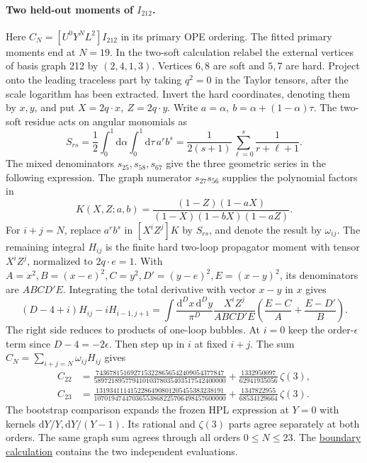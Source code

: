 \paragraph{Two held-out moments of \(I_{212}\).}
Here \(C_N=[U^0Y^NL^2]I_{212}\) in its primary OPE ordering.
The fitted primary moments end at \(N=19\). In the two-soft calculation
relabel the external vertices of basis graph 212 by \((2,4,1,3)\).
Vertices \(6,8\) are soft and \(5,7\) are hard. Project onto the leading
traceless part by taking \(q^2=0\) in the Taylor tensors, after the scale
logarithm has been extracted. Invert the hard coordinates, denoting them
by \(x,y\), and put \(X=2q\cdot x,\ Z=2q\cdot y\).
Write \(a=\alpha,\ b=\alpha+(1-\alpha)\tau\). The two-soft residue acts on
angular monomials as
\[
 S_{rs}=\frac12\int_0^1\!\mathrm d\alpha\int_0^1\!\mathrm d\tau\,a^r b^s
       =\frac1{2(s+1)}\sum_{\ell=0}^{s}\frac1{r+\ell+1}.
\]
The mixed denominators \(s_{25},s_{58},s_{67}\) give the three geometric
series in the following expression. The graph numerator \(s_{27}s_{56}\)
supplies the polynomial factors in
\[
 K(X,Z;a,b)=\frac{(1-Z)(1-aX)}{(1-X)(1-bX)(1-aZ)} .
\]
For \(i+j=N\), replace \(a^r b^s\) in \([X^iZ^j]K\) by \(S_{rs}\), and denote
the result by \(\omega_{ij}\). The remaining integral \(H_{ij}\) is the finite
hard two-loop propagator moment with tensor \(X^iZ^j\), normalized to
\(2q\cdot e=1\). With \(A=x^2,B=(x-e)^2,C=y^2,D'=(y-e)^2,E=(x-y)^2\),
its denominators are \(ABCD'E\). Integrating the total derivative with
vector \(x-y\) in \(x\) gives
\[
 (D-4+i)H_{ij}-iH_{i-1,j+1}
 =\int\frac{\mathrm d^Dx\,\mathrm d^Dy}{\pi^D}
 \frac{X^i Z^j}{ABCD'E}\left(\frac{E-C}{A}+\frac{E-D'}{B}\right).
\]
The right side reduces to products of one-loop bubbles. At \(i=0\) keep the
order-\(\epsilon\) term since \(D-4=-2\epsilon\). Then step up in \(i\) at
fixed \(i+j\). The sum \(C_N=\sum_{i+j=N}\omega_{ij}H_{ij}\) gives
\begin{align*}
 C_{22}&=\frac{7436781516927153228656542409054377847}{58972189577941010378035403517542400000}
       +\frac{1332950097}{62941935056}\,\zeta(3),\\
 C_{23}&=\frac{1319341114152286490801205455383238191}{10701947447036553868225706498457600000}
       +\frac{1347822955}{68534129664}\,\zeta(3).
\end{align*}
The bootstrap comparison expands the frozen HPL expression at \(Y=0\) with
kernels \(\mathrm dY/Y,\mathrm dY/(Y-1)\). Its rational and \(\zeta(3)\)
parts agree separately at both orders. The same graph sum agrees through all
orders \(0\le N\le23\). The \href{https://github.com/windfolgen/svbwalkthrough/tree/main/runs/fourloopI212}{boundary calculation}
contains the two independent evaluations.
